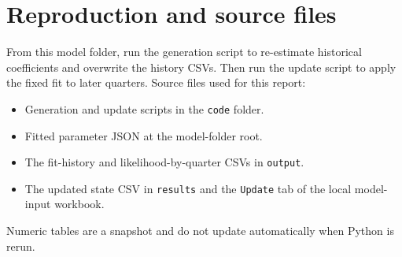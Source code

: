 \documentclass[11pt,a4paper]{article}
\begin{document}
\section{Reproduction and source files}
From this model folder, run the generation script to re-estimate historical
coefficients and overwrite the history CSVs. Then run the update script to
apply the fixed fit to later quarters. Source files used for this report:
\begin{itemize}
\item Generation and update scripts in the \texttt{code} folder.
\item Fitted parameter JSON at the model-folder root.
\item The fit-history and likelihood-by-quarter CSVs in \texttt{output}.
\item The updated state CSV in \texttt{results} and the \texttt{Update}
      tab of the local model-input workbook.
\end{itemize}
Numeric tables are a snapshot and do not update automatically when Python is
rerun.
\end{document}

